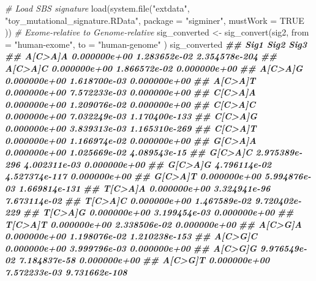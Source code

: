 \documentclass[
  12pt,
  a4paper,
  twoside]{book}
\newenvironment{Shaded}{\begin{snugshade}}{\end{snugshade}}
\newcommand{\AttributeTok}[1]{\textcolor[rgb]{0.77,0.63,0.00}{#1}}
\newcommand{\CommentTok}[1]{\textcolor[rgb]{0.56,0.35,0.01}{\textit{#1}}}
\newcommand{\ConstantTok}[1]{\textcolor[rgb]{0.00,0.00,0.00}{#1}}
\newcommand{\DocumentationTok}[1]{\textcolor[rgb]{0.56,0.35,0.01}{\textbf{\textit{#1}}}}
\newcommand{\FunctionTok}[1]{\textcolor[rgb]{0.00,0.00,0.00}{#1}}
\newcommand{\NormalTok}[1]{#1}
\newcommand{\OtherTok}[1]{\textcolor[rgb]{0.56,0.35,0.01}{#1}}
\newcommand{\StringTok}[1]{\textcolor[rgb]{0.31,0.60,0.02}{#1}}
\begin{document}
\begin{Shaded}
\begin{Highlighting}[]
\CommentTok{\# Load SBS signature}
\FunctionTok{load}\NormalTok{(}\FunctionTok{system.file}\NormalTok{(}\StringTok{"extdata"}\NormalTok{, }\StringTok{"toy\_mutational\_signature.RData"}\NormalTok{,}
  \AttributeTok{package =} \StringTok{"sigminer"}\NormalTok{, }\AttributeTok{mustWork =} \ConstantTok{TRUE}
\NormalTok{))}
\CommentTok{\# Exome{-}relative to Genome{-}relative}
\NormalTok{sig\_converted }\OtherTok{\textless{}{-}} \FunctionTok{sig\_convert}\NormalTok{(sig2,}
  \AttributeTok{from =} \StringTok{"human{-}exome"}\NormalTok{,}
  \AttributeTok{to =} \StringTok{"human{-}genome"}
\NormalTok{)}
\NormalTok{sig\_converted}
\DocumentationTok{\#\#                  Sig1          Sig2          Sig3}
\DocumentationTok{\#\# A[C\textgreater{}A]A  0.000000e+00  1.283652e{-}02 2.354578e{-}204}
\DocumentationTok{\#\# A[C\textgreater{}A]C  0.000000e+00  1.866572e{-}02  0.000000e+00}
\DocumentationTok{\#\# A[C\textgreater{}A]G  0.000000e+00  1.618700e{-}03  0.000000e+00}
\DocumentationTok{\#\# A[C\textgreater{}A]T  0.000000e+00  7.572233e{-}03  0.000000e+00}
\DocumentationTok{\#\# C[C\textgreater{}A]A  0.000000e+00  1.209076e{-}02  0.000000e+00}
\DocumentationTok{\#\# C[C\textgreater{}A]C  0.000000e+00  7.032249e{-}03 1.170400e{-}133}
\DocumentationTok{\#\# C[C\textgreater{}A]G  0.000000e+00  3.839313e{-}03 1.165310e{-}269}
\DocumentationTok{\#\# C[C\textgreater{}A]T  0.000000e+00  1.166974e{-}02  0.000000e+00}
\DocumentationTok{\#\# G[C\textgreater{}A]A  0.000000e+00  1.025669e{-}02  4.089543e{-}15}
\DocumentationTok{\#\# G[C\textgreater{}A]C 2.975389e{-}296  4.002311e{-}03  0.000000e+00}
\DocumentationTok{\#\# G[C\textgreater{}A]G  4.796114e{-}02 4.527374e{-}117  0.000000e+00}
\DocumentationTok{\#\# G[C\textgreater{}A]T  0.000000e+00  5.994876e{-}03 1.669814e{-}131}
\DocumentationTok{\#\# T[C\textgreater{}A]A  0.000000e+00  3.324941e{-}96  7.673114e{-}02}
\DocumentationTok{\#\# T[C\textgreater{}A]C  0.000000e+00  1.467589e{-}02 9.720402e{-}229}
\DocumentationTok{\#\# T[C\textgreater{}A]G  0.000000e+00  3.199454e{-}03  0.000000e+00}
\DocumentationTok{\#\# T[C\textgreater{}A]T  0.000000e+00  2.338506e{-}02  0.000000e+00}
\DocumentationTok{\#\# A[C\textgreater{}G]A  0.000000e+00  1.198076e{-}02 1.210238e{-}153}
\DocumentationTok{\#\# A[C\textgreater{}G]C  0.000000e+00  3.999796e{-}03  0.000000e+00}
\DocumentationTok{\#\# A[C\textgreater{}G]G  9.976549e{-}02  7.184837e{-}58  0.000000e+00}
\DocumentationTok{\#\# A[C\textgreater{}G]T  0.000000e+00  7.572233e{-}03 9.731662e{-}108}

\end{Highlighting}
\end{Shaded}
\end{document}
